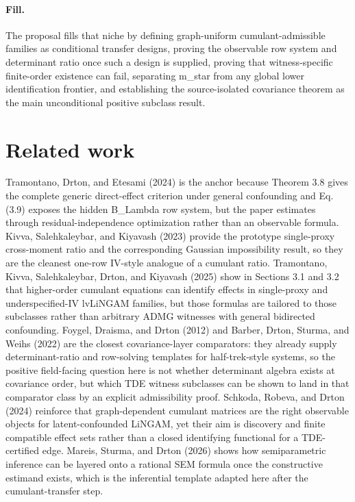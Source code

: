 \documentclass{article}
\begin{document}
\paragraph{Fill.} The proposal fills that niche by defining graph-uniform cumulant-admissible families as conditional transfer designs, proving the observable row system and determinant ratio once such a design is supplied, proving that witness-specific finite-order existence can fail, separating m_star from any global lower identification frontier, and establishing the source-isolated covariance theorem as the main unconditional positive subclass result.

\section{Related work}

Tramontano, Drton, and Etesami (2024) is the anchor because Theorem 3.8 gives the complete generic direct-effect criterion under general confounding and Eq. (3.9) exposes the hidden B_Lambda row system, but the paper estimates through residual-independence optimization rather than an observable formula. Kivva, Salehkaleybar, and Kiyavash (2023) provide the prototype single-proxy cross-moment ratio and the corresponding Gaussian impossibility result, so they are the cleanest one-row IV-style analogue of a cumulant ratio. Tramontano, Kivva, Salehkaleybar, Drton, and Kiyavash (2025) show in Sections 3.1 and 3.2 that higher-order cumulant equations can identify effects in single-proxy and underspecified-IV lvLiNGAM families, but those formulas are tailored to those subclasses rather than arbitrary ADMG witnesses with general bidirected confounding. Foygel, Draisma, and Drton (2012) and Barber, Drton, Sturma, and Weihs (2022) are the closest covariance-layer comparators: they already supply determinant-ratio and row-solving templates for half-trek-style systems, so the positive field-facing question here is not whether determinant algebra exists at covariance order, but which TDE witness subclasses can be shown to land in that comparator class by an explicit admissibility proof. Schkoda, Robeva, and Drton (2024) reinforce that graph-dependent cumulant matrices are the right observable objects for latent-confounded LiNGAM, yet their aim is discovery and finite compatible effect sets rather than a closed identifying functional for a TDE-certified edge. Mareis, Sturma, and Drton (2026) shows how semiparametric inference can be layered onto a rational SEM formula once the constructive estimand exists, which is the inferential template adapted here after the cumulant-transfer step.
\end{document}
